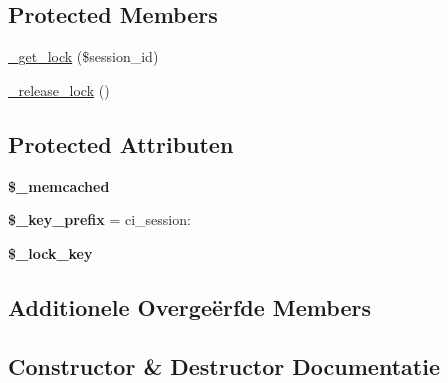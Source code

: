 \subsection*{Protected Members}
\begin{DoxyCompactItemize}
\item 
\mbox{\hyperlink{class_c_i___session__memcached__driver_a2c49c8e23be3e2aca96a9d20de18ffc2}{\+\_\+get\+\_\+lock}} (\$session\+\_\+id)
\item 
\mbox{\hyperlink{class_c_i___session__memcached__driver_a0265e356e6cf1eaba229663c1664c37d}{\+\_\+release\+\_\+lock}} ()
\end{DoxyCompactItemize}
\subsection*{Protected Attributen}
\begin{DoxyCompactItemize}
\item 
\mbox{\label{class_c_i___session__memcached__driver_a9ce5188201bbc41ed4374947a35dadcc}} 
{\bfseries \$\+\_\+memcached}
\item 
\mbox{\label{class_c_i___session__memcached__driver_a177f231cc2eec31d9aa8f50f9ec9b407}} 
{\bfseries \$\+\_\+key\+\_\+prefix} = \textquotesingle{}ci\+\_\+session\+:\textquotesingle{}
\item 
\mbox{\label{class_c_i___session__memcached__driver_a79bf61cb0768c7bb23404280ae004fb4}} 
{\bfseries \$\+\_\+lock\+\_\+key}
\end{DoxyCompactItemize}
\subsection*{Additionele Overge\"{e}rfde Members}


\subsection{Constructor \& Destructor Documentatie}
\mbox{\label{class_c_i___session__memcached__driver_ac1669c73d53d6f16cf5459a1e84d39c8}} 

